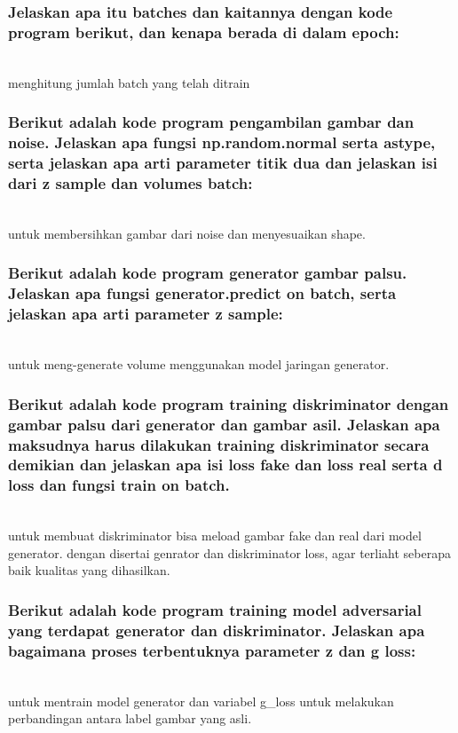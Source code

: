 \subsubsection{Jelaskan apa itu batches dan kaitannya dengan kode program berikut, dan kenapa berada di dalam epoch:}
\hfill\\

menghitung jumlah batch yang telah ditrain

\subsubsection{Berikut adalah kode program pengambilan gambar dan noise. Jelaskan apa fungsi np.random.normal serta astype, serta jelaskan apa arti parameter titik dua dan jelaskan isi dari z sample dan volumes batch:}
\hfill\\

untuk membersihkan gambar dari noise dan menyesuaikan shape.

\subsubsection{Berikut adalah kode program generator gambar palsu. Jelaskan apa fungsi generator.predict on batch, serta jelaskan apa arti parameter z sample:}
\hfill\\

untuk meng-generate volume menggunakan model jaringan generator.


\subsubsection{Berikut adalah kode program training diskriminator dengan gambar palsu dari generator dan gambar asil. Jelaskan apa maksudnya harus dilakukan training diskriminator secara demikian dan jelaskan apa isi loss fake dan loss real serta d loss dan fungsi train on batch.}
\hfill\\

untuk membuat diskriminator bisa meload gambar fake dan real dari model generator. dengan disertai genrator dan diskriminator loss, agar terliaht seberapa baik kualitas yang dihasilkan.


\subsubsection{Berikut adalah kode program training model adversarial yang terdapat generator dan diskriminator. Jelaskan apa bagaimana proses terbentuknya parameter z dan g loss:}
\hfill\\

untuk mentrain model generator dan variabel g\_loss untuk melakukan perbandingan antara label gambar yang asli.

